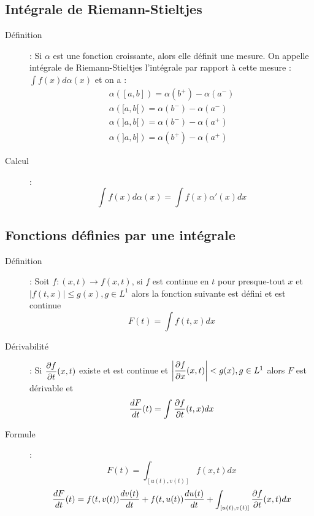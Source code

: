 \subsection{Intégrale de Riemann-Stieltjes}
\begin{description}
\item[Définition] : Si $\alpha$ est une fonction croissante, alors elle définit une mesure.
    On appelle intégrale de Riemann-Stieltjes l’intégrale par rapport à cette mesure :
    $\int f(x)d\alpha(x)$
    et on a :
    \[
    \begin{split}
        \alpha([a, b]) = \alpha(b^+)-\alpha(a^-)\\
        \alpha([a, b[) = \alpha(b^-)-\alpha(a^-)\\
        \alpha(]a, b[) = \alpha(b^-)-\alpha(a^+)\\
        \alpha(]a, b]) = \alpha(b^+)-\alpha(a^+)
    \end{split}
    \]
\item[Calcul] : 
    \[ \int f(x)d\alpha(x)=\int f(x)\alpha'(x)dx \]
\end{description}
\subsection{Fonctions définies par une intégrale}
\begin{description}
\item[Définition] : Soit $f:(x, t)\rightarrow f(x, t)$, si $f$ est continue en $t$ pour presque-tout $x$
    et $|f(t, x)| \le g(x), g \in L^1$
    alors la fonction suivante est défini et est continue
    \[ F(t)=\int f(t,x)dx \]
\item[Dérivabilité] : Si $\dfrac{\partial f}{\partial t}(x,t)$ existe et est continue et
    $\left|\dfrac{\partial f}{\partial x}(x,t)\right|<g(x),g\in L^1$ alors $F$ est dérivable et 
    \[ \frac{dF}{dt}(t)=\int \dfrac{\partial f}{\partial t}(t,x)dx \]
\item[Formule] : 
    \[ F(t)=\int_{[u(t),v(t)]}f(x,t)dx \]
    \[
        \frac{dF}{dt}(t)=
        f(t,v(t))\frac{dv(t)}{dt}+
        f(t,u(t))\frac{du(t)}{dt}+
        \int_{[u(t),v(t)]}\dfrac{\partial f}{\partial t}(x,t)dx
    \]
\end{description}
